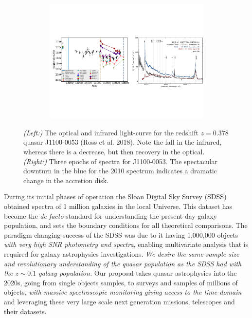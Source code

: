 \documentclass[oneside, a4paper, onecolumn, 11pt]{article}
\begin{document}
\begin{figure}[h]
  \begin{center}
    \hspace{-0.5cm}
    \includegraphics[height=6.25cm,width=17.2cm]
    {figures/J110057_LC_Spectra_20171024.pdf}
    \vspace{-10pt}
    \caption{%
      \footnotesize 
      {\it (Left:)} The optical and infrared light-curve for the redshift $z=0.378$ quasar 
      J1100-0053 (Ross et al. 2018). 
      Note the fall in the infrared, whereas there is a decrease, but 
      then recovery in the optical. 
      {\it (Right:)} 
      Three epochs of spectra for J1100-0053. 
      The spectacular downturn in the blue for the 2010 spectrum 
      indicates a dramatic change in the accretion disk.
    }
  \vspace{-16pt}
 \label{fig:J110057}
\end{center}
\end{figure}


\smallskip
\smallskip
\noindent
During its initial phases of operation the Sloan Digital Sky
Survey (SDSS) obtained spectra of 1 million galaxies in the local
Universe. This dataset has become the {\it de facto} standard for
understanding the present day galaxy population, and sets the boundary
conditions for all theoretical comparisons. The paradigm changing
success of the SDSS was due to it having 1,000,000 objects {\it with very 
high SNR photometry and spectra}, enabling
multivariate analysis that is required for galaxy
astrophysics investigations.  {\it We desire the same sample size and revolutionary
understanding of the quasar population as the SDSS had with the
$z\sim0.1$ galaxy population.}  Our proposal takes quasar astrophysics
into the 2020s, going from single objects samples, to surveys and
samples of millions of objects, {\it with massive spectroscopic monitoring 
giving access to the time-domain} and leveraging these very large scale next
generation missions, telescopes and their datasets.
\end{document}
